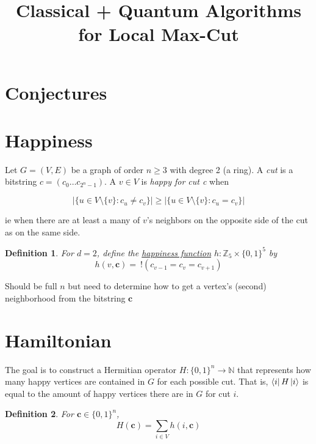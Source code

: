 \documentclass[10pt]{article}
\newtheorem{definition}{Definition}
\begin{document}
\title{Classical + Quantum Algorithms for Local Max-Cut}
\date{}
\maketitle

\section*{Conjectures}


\section*{Happiness}
Let $G = (V,E)$ be a graph of order $n \geq 3$ with degree 2 (a ring). A  \emph{cut} is a bitstring $c=(c_0 \dots c_{2^n - 1})$. A $v \in V$ is \emph{happy for cut c} when 

\begin{equation}
|\{u \in V\setminus \{v\} : c_u \neq c_v \}| \geq |\{u \in V\setminus \{v\} : c_u = c_v \}|
\end{equation}

\noindent ie when there are at least a many of $v$'s neighbors on the opposite side of the cut as on the same side. 

\begin{definition}
    For $d=2$, define the \underline{happiness function} $h : \mathbb{Z}_5 \times \{0,1\}^5$ by
\begin{equation}
    h(v,\mathbf{c}) =\ !(c_{v-1} = c_v = c_{v+1})
\end{equation}
\end{definition}
Should be full $n$ but need to determine how to get a vertex's (second) neighborhood from the bitstring $\textbf{c}$

\section*{Hamiltonian}
The goal is to construct a Hermitian operator $H: \{0,1\}^n \rightarrow \mathbb{N}$ that represents how many happy vertices are contained in $G$ for each possible cut. That is, $\bra{i}H\ket{i}$ is equal to the amount of happy vertices there are in $G$ for cut $i$. 
\begin{definition}
For $\mathbf{c} \in \{0,1\}^n$,
\begin{equation}
    H(\mathbf{c}) = \sum_{i \in V} h(i, \mathbf{c})
\end{equation}
\end{definition}
\end{document}
